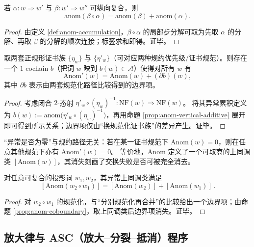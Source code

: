 \begin{proposition}[纵向复合的严格加法性]\label{prop:anom-vertical-additive}
若 $\alpha:w\Rightarrow w'$ 与 $\beta:w'\Rightarrow w''$ 可纵向复合，则
$$
\mathrm{anom}(\beta\circ\alpha)=\mathrm{anom}(\beta)+\mathrm{anom}(\alpha).
$$
\end{proposition}
\begin{proof}
由定义 \ref{def:anom-accumulation}，$\beta\circ\alpha$ 的局部步分解可取为先取 $\alpha$ 的分解、再取 $\beta$ 的分解的顺次连接；标签求和即得。证毕。
\end{proof}

\begin{proposition}\label{prop:anom-coboundary}
取两套正规形证书族 $\{\eta_w\}$ 与 $\{\eta'_w\}$（可对应两种规约优先级/证书规范）。则存在一个 $1$-cochain $b$（把词 $w$ 映到 $b(w)\in\mathcal{A}$）使得对所有 $w$ 有
$$
\mathrm{Anom}'(w)=\mathrm{Anom}(w)+(\partial b)(w),
$$
其中 $\partial b$ 表示由两套规范化路径比较得到的边界项。
\end{proposition}
\begin{proof}
考虑闭合 $2$-态射
$
\eta'_w\circ(\eta_w)^{-1}:\mathrm{NF}(w)\Rightarrow \mathrm{NF}(w)
$。
将其异常累积定义为 $b(w):=\mathrm{anom}\bigl(\eta'_w\circ(\eta_w)^{-1}\bigr)$，再用命题 \ref{prop:anom-vertical-additive} 展开即可得到所示关系；边界项仅由“换规范化证书族”的差异产生。证毕。
\end{proof}

\begin{corollary}[零异常是路径不变量]\label{cor:anom-zero-invariant}
“异常是否为零”与规约路径无关：若在某一证书规范下 $\mathrm{Anom}(w)=0$，则在任意其他规范下亦有 $\mathrm{Anom}'(w)=0$。
等价地，$\mathrm{Anom}$ 定义了一个可取商的上同调类 $[\mathrm{Anom}(w)]$，其消失刻画了交换失败是否可被完全消去。
\end{corollary}

\begin{corollary}[水平复合下异常类的严格加法性]\label{cor:anom-class-additive}
对任意可复合的投影词 $w_1,w_2$，其异常上同调类满足
$$
\boxed{\ [\mathrm{Anom}(w_2\circ w_1)]=[\mathrm{Anom}(w_2)]+[\mathrm{Anom}(w_1)]\ }.
$$
\end{corollary}
\begin{proof}
对 $w_2\circ w_1$ 的规范化，与“分别规范化再合并”的比较给出一个边界项；由命题 \ref{prop:anom-coboundary}，取上同调类后边界项消失。证毕。
\end{proof}

\subsection{放大律与 ASC（放大--分裂--抵消）程序}\label{subsec:asc}

